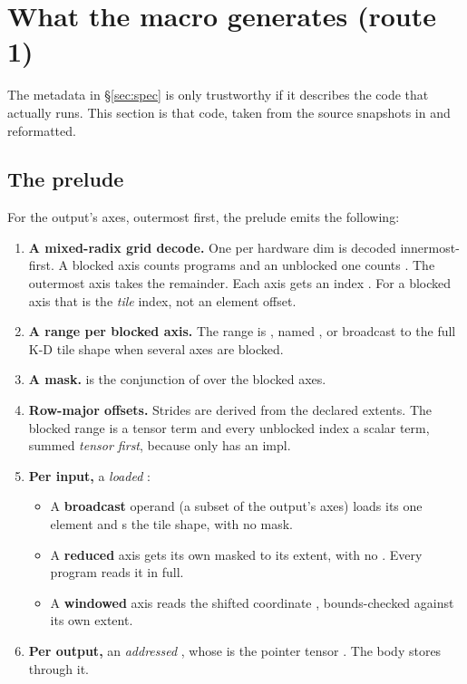 \section{What the macro generates (route 1)}
\label{sec:prelude}

The metadata in \S\ref{sec:spec} is only trustworthy if it describes the code that
actually runs. This section is that code, taken from the source snapshots in
 and reformatted.

\subsection{The prelude}

For the output's axes, outermost first, the prelude emits the following:
\begin{enumerate}
\item \textbf{A mixed-radix grid decode.} One  per hardware dim is
  decoded innermost-first. A blocked axis counts  programs
  and an unblocked one counts . The outermost axis takes the remainder.
  Each axis gets an index . For a blocked axis that is the
  \emph{tile} index, not an element offset.
\item \textbf{A range per blocked axis.} The range is ,
  named , or  broadcast to the full
  K-D tile shape when several axes are blocked.
\item \textbf{A mask.}  is the conjunction of
   over the blocked axes.
\item \textbf{Row-major offsets.} Strides are derived from the declared extents.
  The blocked range is a tensor term and every unblocked index a scalar term, summed
  \emph{tensor first}, because only  has an impl.
\item \textbf{Per input,} a \emph{loaded} :
  \begin{itemize}
  \item A \textbf{broadcast} operand (a subset of the output's axes) loads its one
    element and s the tile shape, with no mask.
  \item A \textbf{reduced} axis gets its own  masked to its
    extent, with no . Every program reads it in full.
  \item A \textbf{windowed} axis reads the shifted coordinate
    , bounds-checked against its own extent.
  \end{itemize}
\item \textbf{Per output,} an \emph{addressed} , whose  is the
  pointer tensor . The body stores through it.
\end{enumerate}

